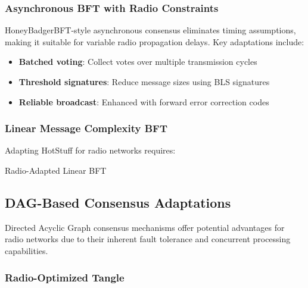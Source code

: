 \documentclass[11pt,a4paper]{article}
\begin{document}
\subsubsection{Asynchronous BFT with Radio Constraints}

HoneyBadgerBFT-style asynchronous consensus eliminates timing assumptions, making it suitable for variable radio propagation delays. Key adaptations include:

\begin{itemize}
\item \textbf{Batched voting}: Collect votes over multiple transmission cycles
\item \textbf{Threshold signatures}: Reduce message sizes using BLS signatures
\item \textbf{Reliable broadcast}: Enhanced with forward error correction codes
\end{itemize}

\subsubsection{Linear Message Complexity BFT}

Adapting HotStuff for radio networks requires:

\begin{algorithm}[H]
\SetAlgoLined
{}
\caption{Radio-Adapted Linear BFT}

\;
\end{algorithm}

\subsection{DAG-Based Consensus Adaptations}

Directed Acyclic Graph consensus mechanisms offer potential advantages for radio networks due to their inherent fault tolerance and concurrent processing capabilities.

\subsubsection{Radio-Optimized Tangle}
\end{document}
